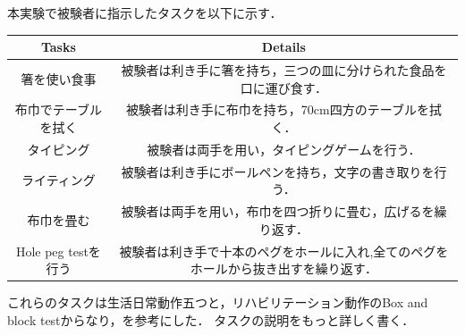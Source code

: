 本実験で被験者に指示したタスクを以下に示す．
\begin{table}[H]
  \begin{tabular}{cc}
    \hline 
    Tasks&   Details\\
        \hline \hline
箸を使い食事&
被験者は利き手に箸を持ち，三つの皿に分けられた食品を口に運び食す．\\

布巾でテーブルを拭く&
被験者は利き手に布巾を持ち，70cm四方のテーブルを拭く．\\

タイピング&
被験者は両手を用い，タイピングゲームを行う．\\

ライティング&
被験者は利き手にボールペンを持ち，文字の書き取りを行う．\\

布巾を畳む&
被験者は両手を用い，布巾を四つ折りに畳む，広げるを繰り返す．\\

Hole peg testを行う&
被験者は利き手で十本のペグをホールに入れ,全てのペグをホールから抜き出すを繰り返す．\\

    \hline
  \end{tabular}
\end{table}

これらのタスクは生活日常動作五つと，リハビリテーション動作のBox and block testからなり，\cite{Taub2011,Mathiowetz1985}を参考にした．
タスクの説明をもっと詳しく書く．
